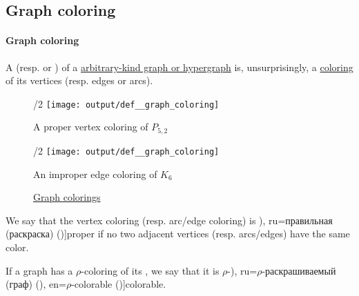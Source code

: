 \subsection{Graph coloring}\label{subsec:graph_coloring}

\paragraph{Graph coloring}

\begin{definition}\label{def:graph_coloring}
  A  (resp.  or ) of a \hyperref[rem:arbitrary_kind_graph]{arbitrary-kind graph or hypergraph} is, unsurprisingly, a \hyperref[def:set_coloring]{coloring} of its vertices (resp. edges or arcs).

  \begin{figure}[!ht]
    \begin{subcaptionblock}{\textwidth/2}
      \centering
      \texttt{[image: output/def\_\_graph\_coloring]}
      \caption{A proper vertex coloring of \hyperref[def:petersen_graph]{\( P_{5,2} \)}}\label{fig:def:graph_coloring/petersen}
    \end{subcaptionblock}
    \hfill
    \begin{subcaptionblock}{\textwidth/2}
      \centering
      \texttt{[image: output/def\_\_graph\_coloring]}
      \caption{An improper edge coloring of \hyperref[def:complete_graph]{\( K_6 \)}}\label{fig:def:graph_coloring/triangle}
    \end{subcaptionblock}
    \caption{\hyperref[def:graph_coloring]{Graph colorings}}\label{fig:def:graph_coloring}
  \end{figure}

  \begin{thmenum}
     We say that the vertex coloring (resp. arc/edge coloring) is \term[bg=правилно (оцветяване) (\cite[141]{Мирчев2001}), ru=правильная (раскраска) (\cite[306]{Емеличев1990})]{proper} if no two adjacent vertices (resp. arcs/edges) have the same color.

     If a graph has a \( \rho \)-coloring of its , we say that it is \( \rho \)-\term[bg=\( \rho \)-оцветим (граф) (\cite[141]{Мирчев2001}), ru=\( \rho \)-раскрашиваемый (граф) (\cite[\S 53]{Емеличев1990}), en=\( \rho \)-colorable (\cite[111]{Diestel2005})]{colorable}.
  \end{thmenum}
\end{definition}
